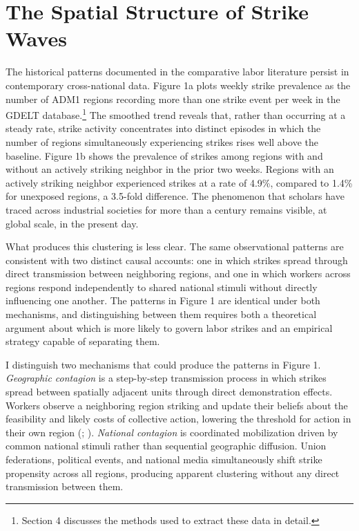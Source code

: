 \documentclass[
  11pt,
]{article}
\begin{document}
\section{The Spatial Structure of Strike
Waves}\label{the-spatial-structure-of-strike-waves}

The historical patterns documented in the comparative labor literature
persist in contemporary cross-national data. Figure 1a plots weekly
strike prevalence as the number of ADM1 regions recording more than one
strike event per week in the GDELT database.\footnote{Section 4
  discusses the methods used to extract these data in detail.} The
smoothed trend reveals that, rather than occurring at a steady rate,
strike activity concentrates into distinct episodes in which the number
of regions simultaneously experiencing strikes rises well above the
baseline. Figure 1b shows the prevalence of strikes among regions with
and without an actively striking neighbor in the prior two weeks.
Regions with an actively striking neighbor experienced strikes at a rate
of 4.9\%, compared to 1.4\% for unexposed regions, a 3.5-fold
difference. The phenomenon that scholars have traced across industrial
societies for more than a century remains visible, at global scale, in
the present day.

What produces this clustering is less clear. The same observational
patterns are consistent with two distinct causal accounts: one in which
strikes spread through direct transmission between neighboring regions,
and one in which workers across regions respond independently to shared
national stimuli without directly influencing one another. The patterns
in Figure 1 are identical under both mechanisms, and distinguishing
between them requires both a theoretical argument about which is more
likely to govern labor strikes and an empirical strategy capable of
separating them.

I distinguish two mechanisms that could produce the patterns in Figure
1. \emph{Geographic contagion} is a step-by-step transmission process in
which strikes spread between spatially adjacent units through direct
demonstration effects. Workers observe a neighboring region striking and
update their beliefs about the feasibility and likely costs of
collective action, lowering the threshold for action in their own region
(;
). \emph{National
contagion} is coordinated mobilization driven by common national stimuli
rather than sequential geographic diffusion. Union federations,
political events, and national media simultaneously shift strike
propensity across all regions, producing apparent clustering without any
direct transmission between them.
\end{document}
